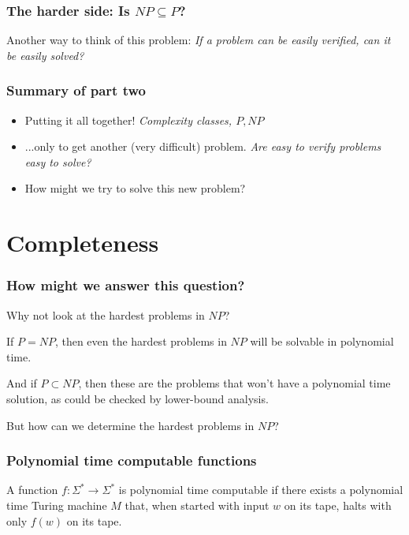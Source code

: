 \documentclass[aspectratio=169]{beamer}
\begin{document}
\begin{frame}
\frametitle{The harder side: Is $NP \subseteq P$?}

Another way to think of this problem: {\em If a problem can be easily verified, can it be easily solved?}
\end{frame}

\begin{frame}
\frametitle{Summary of part two}
\begin{itemize}
    \item Putting it all together! {\em Complexity classes, $P, NP$}
    \item ...only to get another (very difficult) problem. {\em Are easy to verify problems easy to solve?}
    \item How might we try to solve this new problem?
\end{itemize}
\end{frame}

\section{Completeness}

\begin{frame}
\frametitle{How might we answer this question?}

Why not look at the hardest problems in $NP$?

If $P = NP$, then even the hardest problems in $NP$ will be solvable in polynomial time.

And if $P \subset NP$, then these are the problems that won't have a polynomial time solution, as could be checked by lower-bound analysis.

But how can we determine the hardest problems in $NP$?
\end{frame}

\begin{frame}
\frametitle{Polynomial time computable functions}

A function $f:\Sigma^* \to \Sigma^*$ is polynomial time computable if there exists a polynomial time Turing machine $M$ that, when started with input $w$ on its tape, halts with only $f(w)$ on its tape.

\end{frame}
\end{document}
